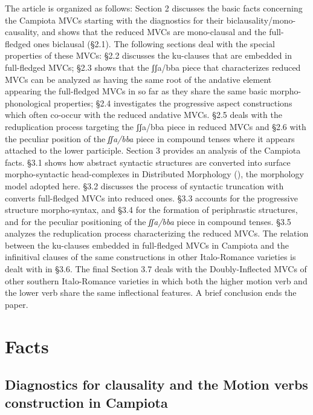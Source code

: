 \documentclass[output=paper]{langscibook}
\begin{document}
The article is organized as follows:  Section 2 discusses the basic facts concerning the Campiota MVCs starting with the diagnostics for their biclausality/mono-causality, and shows that the reduced MVCs are mono-clausal and the full-fledged ones biclausal (§2.1).  The following sections deal with the special properties of these MVCs:  §2.2 discusses the ku-clauses that are embedded in full-fledged MVCs; §2.3 shows that the ʃʃa/bba piece that characterizes reduced MVCs can be analyzed as having the same root of the andative element appearing  the full-fledged MVCs in so far as they share the same basic morpho-phonological properties; §2.4 investigates the progressive aspect constructions which often co-occur with the reduced andative MVCs. §2.5 deals with the reduplication process targeting the ʃʃa/bba piece in reduced MVCs and §2.6 with the peculiar position of the \textit{ʃʃa/bba} piece in compound tenses where it appears attached to the lower participle.  Section 3 provides an analysis of the Campiota facts. §3.1 shows how abstract syntactic structures are converted into surface morpho-syntactic head-complexes in Distributed Morphology (\citealt{halle1993a}), the morphology model adopted here. §3.2 discusses the process of syntactic truncation with converts full-fledged MVCs into reduced ones. §3.3 accounts for the progressive structure morpho-syntax, and §3.4 for the formation of periphrastic structures, and for the peculiar positioning of the \textit{ʃʃa/bba} piece in compound tenses. §3.5 analyzes the reduplication process characterizing the reduced MVCs. The relation between the ku-clauses embedded in full-fledged MVCs in Campiota and the infinitival clauses of the same constructions in other Italo-Romance varieties is dealt with in §3.6. The final Section 3.7 deals with the Doubly-Inflected MVCs of other southern Italo-Romance varieties in which both the higher motion verb and the lower verb share the same inflectional features. A brief conclusion ends the paper.

\section{Facts}
\subsection{Diagnostics for clausality and the Motion verbs construction in Campiota}
\end{document}

